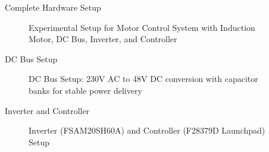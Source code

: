 \begin{frame}{Complete Hardware Setup}
	\begin{figure}
		\centering
		\caption{Experimental Setup for Motor Control System with Induction Motor, DC Bus, Inverter, and Controller}
	\end{figure}
\end{frame}

\begin{frame}{DC Bus Setup}
	\begin{figure}
		\centering
		\caption{DC Bus Setup: 230V AC to 48V DC conversion with capacitor banks for stable power delivery}
	\end{figure}
\end{frame}

\begin{frame}{Inverter and Controller}
	\begin{figure}
		\centering
		\caption{Inverter (FSAM20SH60A) and Controller (F28379D Launchpad) Setup}
	\end{figure}
\end{frame}

